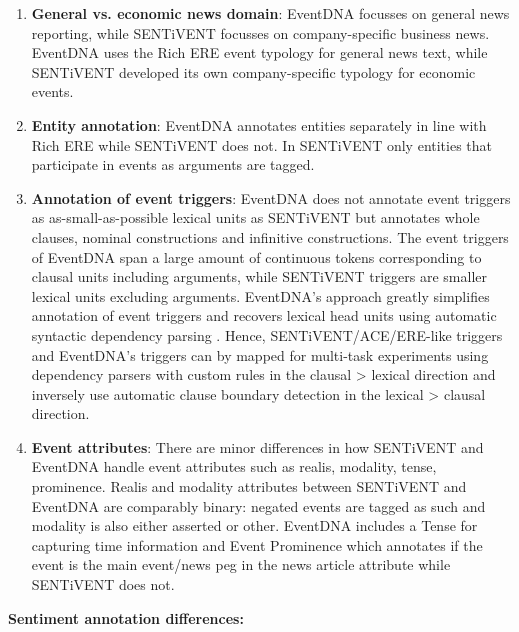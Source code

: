 \begin{enumerate}[wide, labelwidth=!, nolistsep, label=\alph*)]
\item \textbf{General vs. economic news domain}:
EventDNA focusses on general news reporting, while SENTiVENT focusses on company-specific business news.
EventDNA uses the Rich ERE event typology for general news text, while SENTiVENT developed its own company-specific typology for economic events.

\item \textbf{Entity annotation}:
EventDNA annotates entities separately in line with Rich ERE while SENTiVENT does not.
In SENTiVENT only entities that participate in events as arguments are tagged.

\item \textbf{Annotation of event triggers}:
EventDNA does not annotate event triggers as as-small-as-possible lexical units as SENTiVENT but annotates whole clauses, nominal constructions and infinitive constructions.
The event triggers of EventDNA span a large amount of continuous tokens corresponding to clausal units including arguments, while SENTiVENT triggers are smaller lexical units excluding arguments.
EventDNA's approach greatly simplifies annotation of event triggers and recovers lexical head units using automatic syntactic dependency parsing \cite{colruyt2019leveraging}.
Hence, SENTiVENT/ACE/ERE-like triggers and EventDNA's triggers can by mapped for multi-task experiments using dependency parsers with custom rules in the clausal > lexical direction and inversely use automatic clause boundary detection \cite{sharma2016clause} in the lexical > clausal direction.

\item \textbf{Event attributes}: There are minor differences in how SENTiVENT and EventDNA handle event attributes such as realis, modality, tense, prominence.
Realis and modality attributes between SENTiVENT and EventDNA are comparably binary: negated events are tagged as such and modality is also either asserted or other.
EventDNA includes a Tense for capturing time information and Event Prominence which annotates if the event is the main event/news peg in the news article attribute while SENTiVENT does not.\\
\end{enumerate}

\textbf{Sentiment annotation differences:} 

